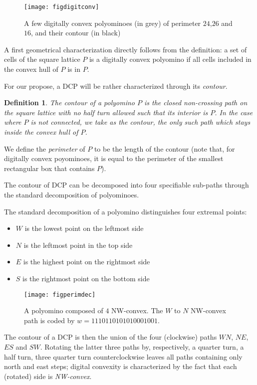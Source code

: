 \documentclass{article}
\newtheorem{definition}[theorem]{Definition}
\begin{document}
\begin{figure}
\begin{center}
\texttt{[image: figdigitconv]}
\end{center}
\caption{A few digitally convex polyominoes (in grey) of perimeter $24$,$26$ and $16$, and their contour (in black) }
\label{polex}
\end{figure}
A first geometrical characterization directly follows from the definition: a set of cells of the
square lattice $P$ is a digitally convex polyomino if all cells included in the convex hull of $P$
is in $P$.



For our propose, a DCP will be rather characterized through its \textit{contour}.
\begin{definition}
The \emph{contour} of a polyomino $P$ is the closed non-crossing path on the square lattice with no half turn allowed such that its interior is $P$.
In the case where $P$ is not connected, we take as the contour, the only such path which stays inside the convex hull of $P$.
\end{definition}

We define the \emph{perimeter} of $P$ to be the length of the
contour (note that, for digitally convex poyominoes, it is equal to the perimeter of the
smallest rectangular box that contains $P$).

The contour of DCP can be decomposed into four specifiable sub-paths through the standard decomposition of polyominoes.



\medskip

The standard decomposition of a polyomino distinguishes four extremal points:
\begin{itemize}
\item{$W$ is the lowest point on the leftmost side}
\item{$N$ is the leftmost point in the top side}
\item{$E$ is the highest point on the rightmost side}
\item{$S$ is the rightmost point on the bottom side}
\end{itemize}
\begin{figure}
\texttt{[image: figperimdec]}
\caption{A polyomino composed of $4$ NW-convex. The $W$ to $N$ NW-convex path is coded by $w=1110110101010001001$.}
\label{NESW}
\end{figure}

The contour of a DCP is then the union of the four (clockwise) paths
$WN$, $NE$, $ES$ and $SW$. Rotating the latter three paths by,
respectively,
a quarter turn, a half turn, three quarter turn counterclockwise leaves
all paths containing only north and east steps; digital convexity is
characterized by the fact that each (rotated) side is
\emph{NW-convex}.
\end{document}
